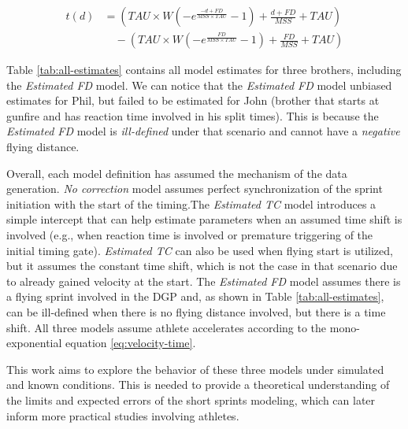 \documentclass[fleqn,10pt,lineno]{wlpeerj} %
\begin{document}
\begin{equation}
  \begin{split}
   t(d) &= (TAU \times W(-e^{\frac{-d + FD}{MSS \times TAU}} - 1) + \frac{d + FD}{MSS} + TAU) \\ 
   &\quad-(TAU \times W(-e^{\frac{FD}{MSS \times TAU}} - 1) + \frac{FD}{MSS} + TAU) 
   \end{split}
   \label{eq:distance-correction}
\end{equation}

Table \ref{tab:all-estimates} contains all model estimates for three brothers, including the \emph{Estimated FD} model. We can notice that the \emph{Estimated FD} model unbiased estimates for Phil, but failed to be estimated for John (brother that starts at gunfire and has reaction time involved in his split times). This is because the \emph{Estimated FD} model is \emph{ill-defined} under that scenario and cannot have a \emph{negative} flying distance.

Overall, each model definition has assumed the mechanism of the data generation. \emph{No correction} model assumes perfect synchronization of the sprint initiation with the start of the timing.The \emph{Estimated TC} model introduces a simple intercept that can help estimate parameters when an assumed time shift is involved (e.g., when reaction time is involved or premature triggering of the initial timing gate). \emph{Estimated TC} can also be used when flying start is utilized, but it assumes the constant time shift, which is not the case in that scenario due to already gained velocity at the start. The \emph{Estimated FD} model assumes there is a flying sprint involved in the DGP and, as shown in Table \ref{tab:all-estimates}, can be ill-defined when there is no flying distance involved, but there is a time shift. All three models assume athlete accelerates according to the mono-exponential equation \eqref{eq:velocity-time}.

This work aims to explore the behavior of these three models under simulated and known conditions. This is needed to provide a theoretical understanding of the limits and expected errors of the short sprints modeling, which can later inform more practical studies involving athletes.
\end{document}
